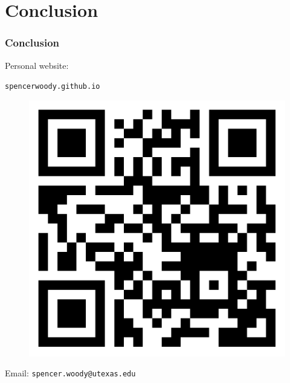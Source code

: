 

\section{Conclusion}
\label{sec:conclusion}


\begin{frame}
  \frametitle{Conclusion}

  Personal website:

  \texttt{spencerwoody.github.io}
  \begin{figure}[htp!]
    \centering
    \includegraphics[width=0.4\linewidth]{figures/qrcode.png}
  \end{figure}
  Email: \texttt{spencer.woody@utexas.edu}
  
\end{frame}


